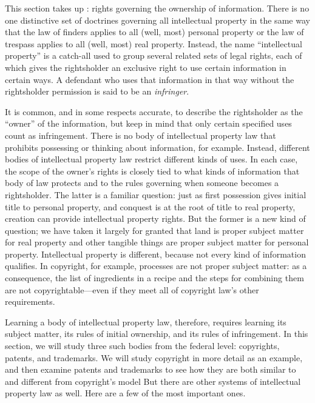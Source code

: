 This section takes up :
rights governing the ownership of
information. There is no one distinctive set of doctrines governing all
intellectual property in the same way that the law of finders applies to all
(well, most) personal property or the law of trespass applies to all (well,
most) real property. Instead, the name ``intellectual property'' is a catch-all
used to group several related sets of legal rights, each of which gives the
rightsholder an exclusive right to use certain information in certain ways. A
defendant who uses that information in that way without the rightsholder
permission is said to be an \textit{infringer}. 

It is common, and in some respects accurate, to describe the rightsholder as the
``owner'' of the information, but keep in mind that only certain specified uses
count as infringement. There is no body of intellectual property law that
prohibits possessing or thinking about information, for example. Instead,
different bodies of intellectual property law restrict different kinds of uses.
In each case, the scope of the owner's rights is closely tied to what kinds of
information that body of law protects and to the rules governing when someone
becomes a rightsholder. The latter is a familiar question: just as first
possession gives initial title to personal property, and conquest is at the
root of title to real property, creation can provide intellectual property
rights. But the former is a new kind of question; we have taken it largely for
granted that land is proper subject matter for real property and other tangible
things are proper subject matter for personal property. Intellectual property
is different, because not every kind of information qualifies. In copyright,
for example, processes are not proper subject matter: as a consequence, the
list of ingredients in a recipe and the steps for combining them are not
copyrightable---even if they meet all of copyright law's other requirements. 

Learning a body of intellectual property law, therefore, requires learning its
subject matter, its rules of initial ownership, and its rules of infringement.
In this section, we will study three such bodies from the federal level:
copyrights, patents, and trademarks. We will study copyright in more detail as
an example, and then examine patents and trademarks to see how they are both
similar to and different from copyright's model But there are other systems of
intellectual property law as well. Here are a few of the most important ones.



